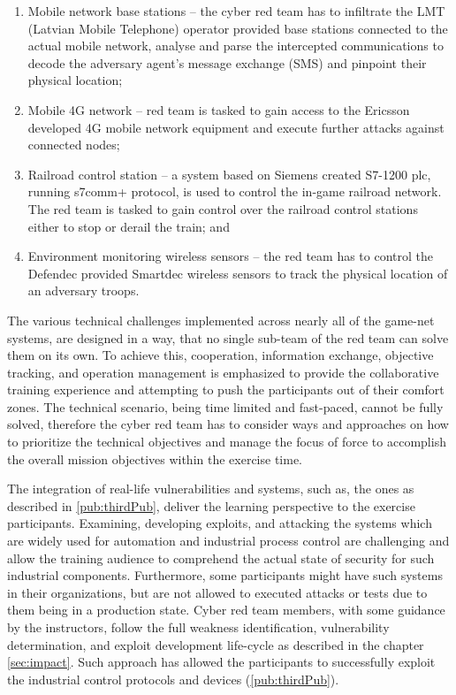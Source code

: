 \begin{enumerate}
    \item Mobile network base stations -- the cyber red team has to infiltrate the LMT (Latvian Mobile Telephone) operator provided base stations connected to the actual mobile network, analyse and parse the intercepted communications to decode the adversary agent's message exchange (SMS) and pinpoint their physical location;
    \item Mobile 4G network -- red team is tasked to gain access to the Ericsson developed 4G mobile network equipment and execute further attacks against connected nodes;
    \item Railroad control station -- a system based on Siemens created S7-1200 \gls{plc}, running s7comm+ protocol, is used to control the in-game railroad network. The red team is tasked to gain control over the railroad control stations either to stop or derail the train; and
    \item Environment monitoring wireless sensors -- the red team has to control the Defendec provided Smartdec wireless sensors to track the physical location of an adversary troops.
\end{enumerate}

The various technical challenges implemented across nearly all of the game-net systems, are designed in a way, that no single sub-team of the red team can solve them on its own. To achieve this, cooperation, information exchange, objective tracking, and operation management is emphasized to provide the collaborative training experience and attempting to push the participants out of their comfort zones. The technical scenario, being time limited and fast-paced, cannot be fully solved, therefore the cyber red team has to consider ways and approaches on how to prioritize the technical objectives and manage the focus of force to accomplish the overall mission objectives within the exercise time.

The integration of real-life vulnerabilities and systems, such as, the ones as described in \ref{pub:thirdPub}, deliver the learning perspective to the exercise participants. Examining, developing exploits, and attacking the systems which are widely used for automation and industrial process control are challenging and allow the training audience to comprehend the actual state of security for such industrial components. Furthermore, some participants might have such systems in their organizations, but are not allowed to executed attacks or tests due to them being in a production state.
Cyber red team members, with some guidance by the instructors, follow the full weakness identification, vulnerability determination, and exploit development life-cycle as described in the chapter \ref{sec:impact}. Such approach has allowed the participants to successfully exploit the industrial control protocols and devices (\ref{pub:thirdPub}).

